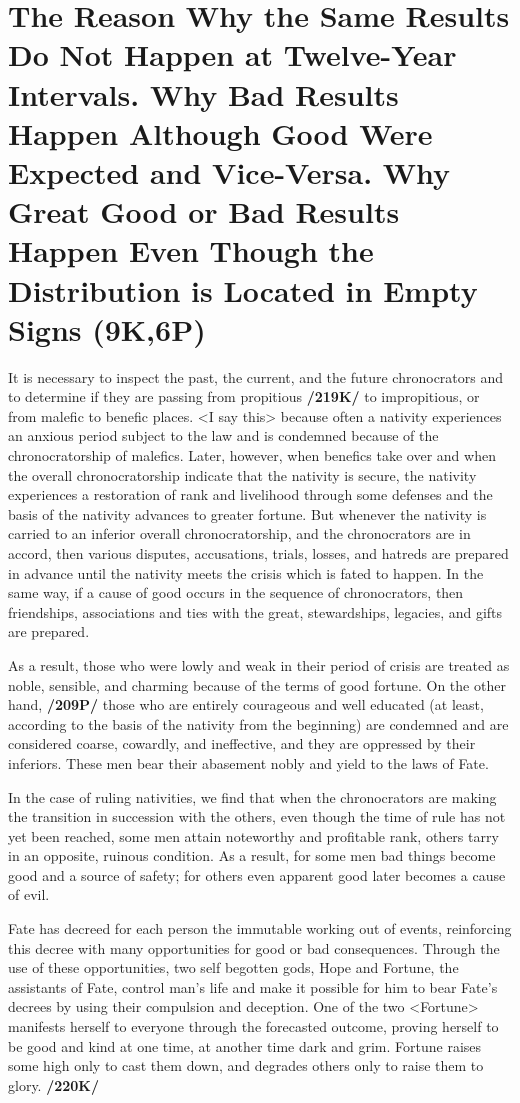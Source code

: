\section{The Reason Why the Same Results Do Not Happen at Twelve-Year Intervals. Why Bad Results Happen Although Good Were Expected and Vice-Versa. Why Great Good or Bad Results Happen Even Though the Distribution is Located in Empty Signs (9K,6P)}

It is necessary to inspect the past, the current, and the future chronocrators and to determine if they are passing from propitious \textbf{/219K/} to impropitious, or from malefic to benefic places. <I say this> because often a nativity experiences an anxious period subject to the law and is condemned because of the
chronocratorship of malefics. Later, however, when benefics take over and when the overall chronocratorship indicate that the nativity is secure, the nativity experiences a restoration of rank and livelihood
through some defenses and the basis of the nativity advances to greater fortune. But whenever the nativity is carried to an inferior overall chronocratorship, and the chronocrators are in accord, then various disputes, accusations, trials, losses, and hatreds are prepared in advance until the nativity meets the crisis which is fated to happen. 
In the same way, if a cause of good occurs in the sequence of chronocrators, then friendships, associations and ties with the great, stewardships, legacies, and gifts are prepared.

As a result, those who were lowly and weak in their period of crisis are treated as noble, sensible, and charming because of the terms of good fortune. On the other hand, \textbf{/209P/} those who are entirely
courageous and well educated (at least, according to the basis of the nativity from the beginning) are condemned and are considered coarse, cowardly, and ineffective, and they are oppressed by their inferiors. These men bear their abasement nobly and yield to the laws of Fate. 

In the case of ruling nativities, we find that when the chronocrators are making the transition in succession with the others, even though the time of rule has not yet been reached, some men attain noteworthy and profitable rank, others tarry in an opposite, ruinous condition. As a result, for some men bad things become good and a source of safety; for others even apparent good later becomes a cause of evil.

Fate has decreed for each person the immutable working out of events, reinforcing this decree with many opportunities for good or bad consequences. Through the use of these opportunities, two self begotten gods, Hope and Fortune, the assistants of Fate, control man’s life and make it possible for him to bear Fate’s decrees by using their compulsion and deception. One of the two <Fortune> manifests herself to everyone through the forecasted outcome, proving herself to be good and kind at one time, at another time dark and grim. Fortune raises some high only to cast them down, and degrades others only to raise them to glory. \textbf{/220K/} 

